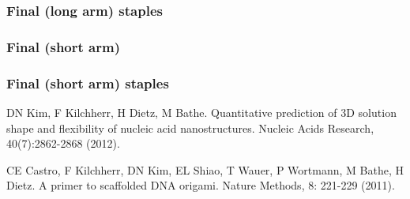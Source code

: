 \documentclass{article}
\begin{document}
\subsubsection{Final (long arm) staples}





\subsubsection{Final (short arm)}

\subsubsection{Final (short arm) staples}



\begin{thebibliography}{9}

    DN Kim, F Kilchherr, H Dietz, M Bathe. Quantitative prediction of 3D solution shape and flexibility of nucleic acid nanostructures. Nucleic Acids Research, 40(7):2862-2868 (2012).

    CE Castro, F Kilchherr, DN Kim, EL Shiao, T Wauer, P Wortmann, M Bathe, H Dietz. A primer to scaffolded DNA origami. Nature Methods, 8: 221-229 (2011).

\end{thebibliography}
\end{document}
